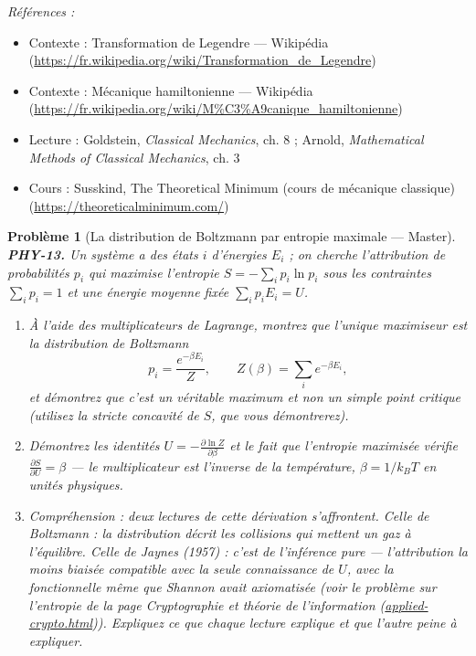 \documentclass[11pt]{article}
\newtheorem{problem}{Problème}
\newenvironment{refs}{\par\small\noindent\emph{Références :}\begin{itemize}\setlength\itemsep{0pt}}{\end{itemize}\normalsize}
\begin{document}
\begin{refs}
\item Contexte : Transformation de Legendre --- Wikipédia (\url{https://fr.wikipedia.org/wiki/Transformation_de_Legendre})
\item Contexte : Mécanique hamiltonienne --- Wikipédia (\url{https://fr.wikipedia.org/wiki/M%C3%A9canique_hamiltonienne})
\item Lecture : Goldstein, \textit{Classical Mechanics}, ch. 8 ; Arnold, \textit{Mathematical Methods of Classical Mechanics}, ch. 3
\item Cours : Susskind, The Theoretical Minimum (cours de mécanique classique) (\url{https://theoreticalminimum.com/})
\end{refs}

\bigskip

\begin{problem}[{La distribution de Boltzmann par entropie maximale --- Master}]
\textbf{PHY-13.} Un système a des états $i$ d'énergies $E_i$ ; on cherche l'attribution de
probabilités $p_i$ qui maximise l'entropie $S = -\sum_i p_i \ln p_i$ sous les contraintes
$\sum_i p_i = 1$ et une énergie moyenne fixée $\sum_i p_i E_i = U$.
\begin{enumerate}
\item[(a)] À l'aide des multiplicateurs de Lagrange, montrez que l'unique maximiseur est la distribution
de Boltzmann
\[ p_i = \frac{e^{-\beta E_i}}{Z}, \qquad Z(\beta) = \sum_i e^{-\beta E_i}, \]
et démontrez que c'est un véritable maximum et non un simple point critique (utilisez la
stricte concavité de $S$, que vous démontrerez).
\item[(b)] Démontrez les identités $U = -\frac{\partial \ln Z}{\partial \beta}$ et le fait que
l'entropie maximisée vérifie $\frac{\partial S}{\partial U} = \beta$ --- le multiplicateur
\textit{est} l'inverse de la température, $\beta = 1/k_B T$ en unités physiques.
\item[(c)] Compréhension : deux lectures de cette dérivation s'affrontent. Celle de Boltzmann : la
distribution décrit les collisions qui mettent un gaz à l'équilibre. Celle de Jaynes (1957) :
c'est de l'inférence pure --- l'attribution la moins biaisée compatible avec la seule connaissance
de $U$, avec la fonctionnelle même que Shannon avait axiomatisée (voir le problème sur
l'entropie de la page Cryptographie et théorie de
l'information (\url{applied-crypto.html})). Expliquez ce que chaque lecture explique et que l'autre peine à
expliquer.
\end{enumerate}

\end{problem}
\end{document}
